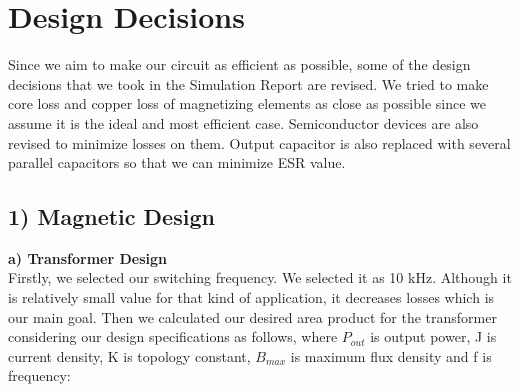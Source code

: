 \documentclass{article}
\newcommand\tab[1][1cm]{\hspace*{#1}}
\begin{document}
\newpage
\section*{Design Decisions}
\tab Since we aim to make our circuit as efficient as possible, some of the design decisions that we took in the Simulation Report are revised. We tried to make core loss and copper loss of magnetizing elements as close as possible since we assume it is the ideal and most efficient case. Semiconductor devices are also revised to minimize losses on them. Output capacitor is also replaced with several parallel capacitors so that we can minimize ESR value.
\subsection*{1) Magnetic Design}
\tab\textbf{a) Transformer Design} \\
\tab Firstly, we selected our switching frequency. We selected it as 10 kHz. Although it is relatively small value for that kind of application, it decreases losses which is our main goal. Then we calculated our desired area product for the transformer considering our design specifications as follows, where $P_{out}$ is output power, J is current density, K is topology constant, $B_{max}$ is maximum flux density and f is frequency:
\end{document}
